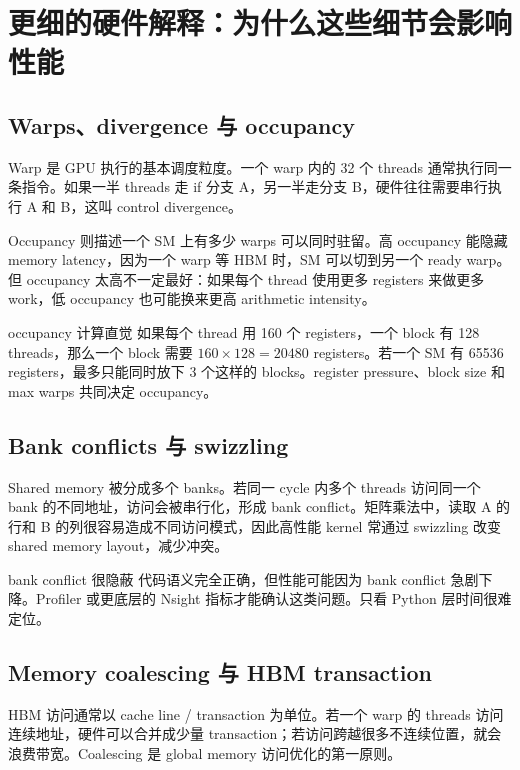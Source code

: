 \documentclass[a4paper]{article}
\begin{document}
\section{更细的硬件解释：为什么这些细节会影响性能}

\subsection{Warps、divergence 与 occupancy}

Warp 是 GPU 执行的基本调度粒度。一个 warp 内的 32 个 threads 通常执行同一条指令。如果一半 threads 走 if 分支 A，另一半走分支 B，硬件往往需要串行执行 A 和 B，这叫 control divergence。

Occupancy 则描述一个 SM 上有多少 warps 可以同时驻留。高 occupancy 能隐藏 memory latency，因为一个 warp 等 HBM 时，SM 可以切到另一个 ready warp。但 occupancy 太高不一定最好：如果每个 thread 使用更多 registers 来做更多 work，低 occupancy 也可能换来更高 arithmetic intensity。

\begin{knowledgebox}{occupancy 计算直觉}
如果每个 thread 用 160 个 registers，一个 block 有 128 threads，那么一个 block 需要 \(160\times128=20480\) registers。若一个 SM 有 65536 registers，最多只能同时放下 3 个这样的 blocks。register pressure、block size 和 max warps 共同决定 occupancy。
\end{knowledgebox}

\subsection{Bank conflicts 与 swizzling}

Shared memory 被分成多个 banks。若同一 cycle 内多个 threads 访问同一个 bank 的不同地址，访问会被串行化，形成 bank conflict。矩阵乘法中，读取 A 的行和 B 的列很容易造成不同访问模式，因此高性能 kernel 常通过 swizzling 改变 shared memory layout，减少冲突。

\begin{warningbox}{bank conflict 很隐蔽}
代码语义完全正确，但性能可能因为 bank conflict 急剧下降。Profiler 或更底层的 Nsight 指标才能确认这类问题。只看 Python 层时间很难定位。
\end{warningbox}

\subsection{Memory coalescing 与 HBM transaction}

HBM 访问通常以 cache line / transaction 为单位。若一个 warp 的 threads 访问连续地址，硬件可以合并成少量 transaction；若访问跨越很多不连续位置，就会浪费带宽。Coalescing 是 global memory 访问优化的第一原则。
\end{document}
